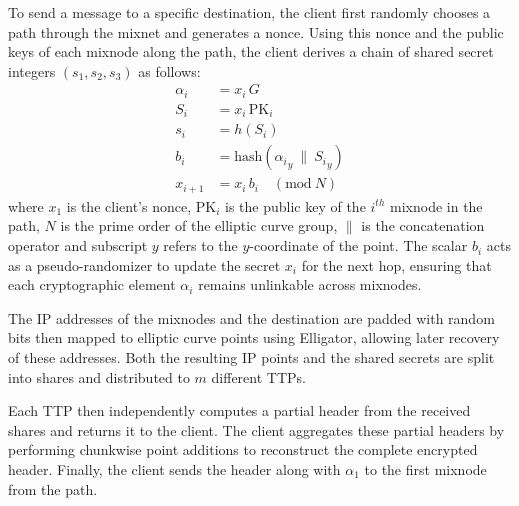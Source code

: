 To send a message to a specific destination, the client first randomly chooses a path through the mixnet and generates a nonce.
Using this nonce and the public keys of each mixnode along the path, the client derives a chain of shared secret integers $ (s_1, s_2, s_3) $ as follows:
$$
\begin{aligned}
    \alpha_i    &= x_i \, G \\
    S_i         &= x_i \, \text{PK}_i \\
    s_i         &= h(S_i) \\
    b_i         &= \text{hash} ( {\alpha_i}_y \ \| \ {S_i}_y ) \\
    x_{i+1}     &= x_i \, b_i \quad (\text{mod}\ N)
\end{aligned}
$$
where $ x_1 $ is the client's nonce, $ \text{PK}_i $ is the public key of the $ i^{th} $ mixnode in the path, 
$ N $ is the prime order of the elliptic curve group, $ \| $ is  the concatenation operator and subscript $ y $ refers to the $ y $-coordinate of the point.
The scalar $ b_i $ acts as a pseudo-randomizer to update the secret $ x_i $ for the next hop, 
ensuring that each cryptographic element $ \alpha_i $ remains unlinkable across mixnodes.

The IP addresses of the mixnodes and the destination are padded with random bits
then mapped to elliptic curve points using Elligator, allowing later recovery of these addresses.
Both the resulting IP points and the shared secrets are split into shares and distributed to $ m $ different TTPs. 


Each TTP then independently computes a partial header from the received shares and returns it to the client. 
The client aggregates these partial headers by performing chunkwise point additions to reconstruct the complete encrypted header.
Finally, the client sends the header along with $ \alpha_1 $ to the first mixnode from the path. 


